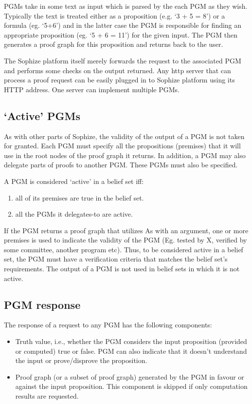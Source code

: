 \documentclass[a4paper]{article}
\begin{document}
PGMs take in some text as input which is parsed by the each PGM as they wish. Typically the text is treated either as a proposition (e.g. `3 + 5 = 8') or a formula (eg. `5+6') and in the latter case the PGM is responsible for finding an appropriate proposition (eg. `5 + 6 = 11') for the given input. The PGM then generates a proof graph for this proposition and returns back to the user.

The Sophize platform itself merely forwards the request to the associated PGM and performs some checks on the output returned. Any http server that can process a proof request can be easily plugged in to Sophize platform using its HTTP address. One server can implement multiple PGMs.

\subsection{`Active' PGMs}
As with other parts of Sophize, the validity of the output of a PGM is not taken for granted. Each PGM must specify all the propositions (premises) that it will use in the root nodes of the proof graph it returns. In addition, a PGM may also delegate parts of proofs to another PGM. These PGMs must also be specified. 

A PGM is considered `active' in a belief set iff:
\begin{enumerate}
\item all of its premises are true in the belief set.
\item all the PGMs it delegates-to are active.
\end{enumerate}

If the PGM returns a proof graph that utilizes As with an argument, one or more premises is used to indicate the validity of the PGM (Eg. tested by X, verified by some committee, another program etc). Thus, to be considered active in a belief set, the PGM must have a verification criteria that matches the belief set's requirements. The output of a PGM is not used in belief sets in which it is not active.

\subsection{PGM response}
The response of a request to any PGM has the following components:

\begin{itemize}

\item Truth value, i.e., whether the PGM considers the input proposition (provided or computed) true or false. PGM can also indicate that it doesn't understand the input or prove/disprove the proposition.

\item Proof graph (or a subset of proof graph) generated by the PGM in favour or against the input proposition. This component is skipped if only computation results are requested.
\end{itemize}
\end{document}
